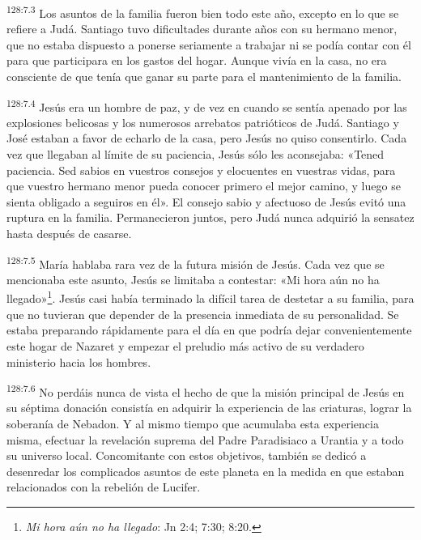 \par 
\textsuperscript{128:7.3} Los asuntos de la familia fueron bien todo este año, excepto en lo que se refiere a Judá. Santiago tuvo dificultades durante años con su hermano menor, que no estaba dispuesto a ponerse seriamente a trabajar ni se podía contar con él para que participara en los gastos del hogar. Aunque vivía en la casa, no era consciente de que tenía que ganar su parte para el mantenimiento de la familia.

\par 
\textsuperscript{128:7.4} Jesús era un hombre de paz, y de vez en cuando se sentía apenado por las explosiones belicosas y los numerosos arrebatos patrióticos de Judá. Santiago y José estaban a favor de echarlo de la casa, pero Jesús no quiso consentirlo. Cada vez que llegaban al límite de su paciencia, Jesús sólo les aconsejaba: «Tened paciencia. Sed sabios en vuestros consejos y elocuentes en vuestras vidas, para que vuestro hermano menor pueda conocer primero el mejor camino, y luego se sienta obligado a seguiros en él». El consejo sabio y afectuoso de Jesús evitó una ruptura en la familia. Permanecieron juntos, pero Judá nunca adquirió la sensatez hasta después de casarse.

\par 
\textsuperscript{128:7.5} María hablaba rara vez de la futura misión de Jesús. Cada vez que se mencionaba este asunto, Jesús se limitaba a contestar: «Mi hora aún no ha llegado»\footnote{\textit{Mi hora aún no ha llegado}: Jn 2:4; 7:30; 8:20.}. Jesús casi había terminado la difícil tarea de destetar a su familia, para que no tuvieran que depender de la presencia inmediata de su personalidad. Se estaba preparando rápidamente para el día en que podría dejar convenientemente este hogar de Nazaret y empezar el preludio más activo de su verdadero ministerio hacia los hombres.

\par 
\textsuperscript{128:7.6} No perdáis nunca de vista el hecho de que la misión principal de Jesús en su séptima donación consistía en adquirir la experiencia de las criaturas, lograr la soberanía de Nebadon. Y al mismo tiempo que acumulaba esta experiencia misma, efectuar la revelación suprema del Padre Paradisiaco a Urantia y a todo su universo local. Concomitante con estos objetivos, también se dedicó a desenredar los complicados asuntos de este planeta en la medida en que estaban relacionados con la rebelión de Lucifer.

